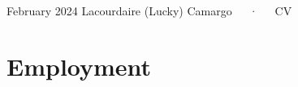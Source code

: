 \documentclass[11pt,a4paper,]{awesome-cv}
\begin{document}
\makecvheader

\makecvfooter
  {February 2024}
    {Lacourdaire (Lucky) Camargo~~~·~~~CV}
  {\thepage}





\hypertarget{employment}{%
\section{Employment}\label{employment}}
\end{document}
